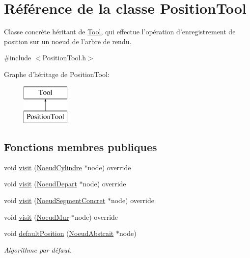 \hypertarget{class_position_tool}{\section{Référence de la classe Position\-Tool}
\label{class_position_tool}
}


Classe concrète héritant de \hyperlink{class_tool}{Tool}, qui effectue l'opération d'enregistrement de position sur un noeud de l'arbre de rendu.  




{\ttfamily \#include $<$Position\-Tool.\-h$>$}

Graphe d'héritage de Position\-Tool\-:\begin{figure}[H]
\begin{center}
\leavevmode
\includegraphics[height=2.000000cm]{class_position_tool}
\end{center}
\end{figure}
\subsection*{Fonctions membres publiques}
\begin{DoxyCompactItemize}
\item 
void \hyperlink{group__inf2990_gac1643483872455c76ef059ac67ae6d04}{visit} (\hyperlink{class_noeud_cylindre}{Noeud\-Cylindre} $\ast$node) override
\item 
void \hyperlink{group__inf2990_ga25f3c9e1decf3bf95d1e7491a2668565}{visit} (\hyperlink{class_noeud_depart}{Noeud\-Depart} $\ast$node) override
\item 
void \hyperlink{group__inf2990_ga48b51161058393ca12df07c9d28197a7}{visit} (\hyperlink{class_noeud_segment_concret}{Noeud\-Segment\-Concret} $\ast$node) override
\item 
void \hyperlink{group__inf2990_gaf80e360d0e162b7075f5272e5860f60f}{visit} (\hyperlink{class_noeud_mur}{Noeud\-Mur} $\ast$node) override
\item 
void \hyperlink{group__inf2990_ga805981677e352dd98b018d04376bb6eb}{default\-Position} (\hyperlink{class_noeud_abstrait}{Noeud\-Abstrait} $\ast$node)
\begin{DoxyCompactList}\small\item\em Algorithme par défaut. \end{DoxyCompactList}\end{DoxyCompactItemize}


